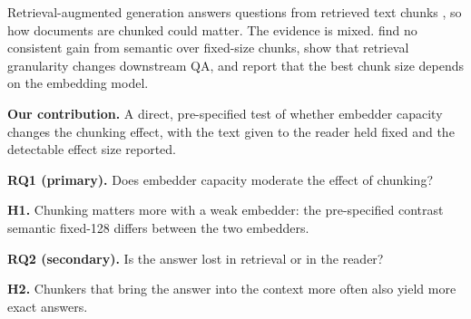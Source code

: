 \documentclass{article}
\newlength{\colw}\setlength{\colw}{269mm}
\newlength{\gut}\setlength{\gut}{16mm}
\newenvironment{col}{\begin{minipage}[t]{\colw}\RaggedRight
  \setlength{\parskip}{2.5mm}}{\end{minipage}}
\newcommand{\lead}[1]{{\bfseries\color{navy}#1}\hspace{0.35em}}
\begin{document}
\noindent
\begin{col}
Retrieval-augmented generation answers questions from retrieved text chunks
\citep{lewis2020rag}, so how documents are chunked could matter. The evidence
is mixed. \citet{qu2025semantic} find no consistent gain from semantic over
fixed-size chunks, \citet{chen2024densex} show that retrieval granularity
changes downstream QA, and \citet{bhat2025chunksize} report that the best
chunk size depends on the embedding model.

\lead{Our contribution.} A direct, pre-specified test of whether embedder
capacity changes the chunking effect, with the text given to the reader held
fixed and the detectable effect size reported.
\end{col}\hspace{\gut}%
\begin{col}
\vspace{-4mm}
\begin{rqbox}
\lead{RQ1 (primary).} Does embedder capacity moderate the effect of chunking?\par
\lead{H1.} Chunking matters more with a weak embedder: the pre-specified
contrast semantic \textminus{} fixed-128 differs between the two embedders.
\end{rqbox}
\vspace{-1mm}
\begin{rqbox}
\lead{RQ2 (secondary).} Is the answer lost in retrieval or in the reader?\par
\lead{H2.} Chunkers that bring the answer into the context more often also
yield more exact answers.
\end{rqbox}
\end{col}

\vspace{2mm}
\end{document}
